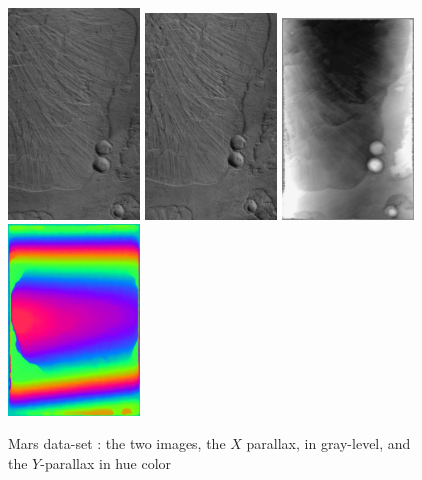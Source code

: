 \begin{figure}
\begin{center}
\includegraphics[width=35mm]{FIGS/Mars/SmaIm1.jpg}
\includegraphics[width=35mm]{FIGS/Mars/SmIm2.jpg}
\includegraphics[width=35mm]{FIGS/Mars/Px1.jpg}
\includegraphics[width=35mm]{FIGS/Mars/Px2.jpg}

\end{center}
\caption{Mars data-set : the two  images, the $X$ parallax, in gray-level, and the $Y$-parallax in
hue color}
\label{FIG:OK:Mars}
\end{figure}



